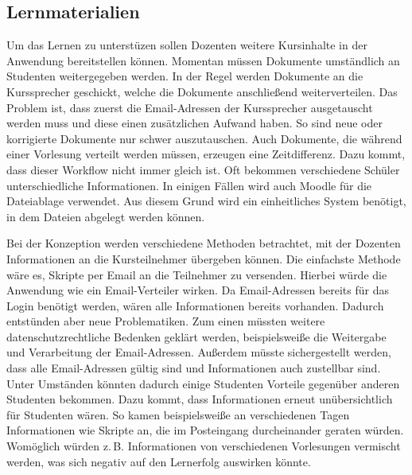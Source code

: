 \subsection{Lernmaterialien}
Um das Lernen zu unterstüzen sollen Dozenten weitere Kursinhalte in der Anwendung bereitstellen können.
Momentan müssen Dokumente umständlich an Studenten weitergegeben werden.
In der Regel werden Dokumente an die Kurssprecher geschickt, welche die Dokumente anschließend weiterverteilen.
Das Problem ist, dass zuerst die Email-Adressen der Kurssprecher ausgetauscht werden muss und diese einen zusätzlichen Aufwand haben.
So sind neue oder korrigierte Dokumente nur schwer auszutauschen.
Auch Dokumente, die während einer Vorlesung verteilt werden müssen, erzeugen eine Zeitdifferenz.
Dazu kommt, dass dieser Workflow nicht immer gleich ist.
Oft bekommen verschiedene Schüler unterschiedliche Informationen.
In einigen Fällen wird auch Moodle für die Dateiablage verwendet.
Aus diesem Grund wird ein einheitliches System benötigt, in dem Dateien abgelegt werden können.

Bei der Konzeption werden verschiedene Methoden betrachtet, mit der Dozenten Informationen an die Kursteilnehmer übergeben können.
Die einfachste Methode wäre es, Skripte per Email an die Teilnehmer zu versenden.
Hierbei würde die Anwendung wie ein Email-Verteiler wirken. Da Email-Adressen bereits für das Login benötigt werden, wären alle Informationen bereits vorhanden.
Dadurch entstünden aber neue Problematiken. Zum einen müssten weitere datenschutzrechtliche Bedenken geklärt werden, beispielsweiße die Weitergabe und Verarbeitung der Email-Adressen. Außerdem müsste sichergestellt werden, dass alle Email-Adressen gültig sind und Informationen auch zustellbar sind. Unter Umständen könnten dadurch einige Studenten Vorteile gegenüber anderen Studenten bekommen.
Dazu kommt, dass Informationen erneut unübersichtlich für Studenten wären. So kamen beispielsweiße an verschiedenen Tagen Informationen wie Skripte an, die im Posteingang durcheinander geraten würden. Womöglich würden z.\,B. Informationen von verschiedenen Vorlesungen vermischt werden, was sich negativ auf den Lernerfolg auswirken könnte.

